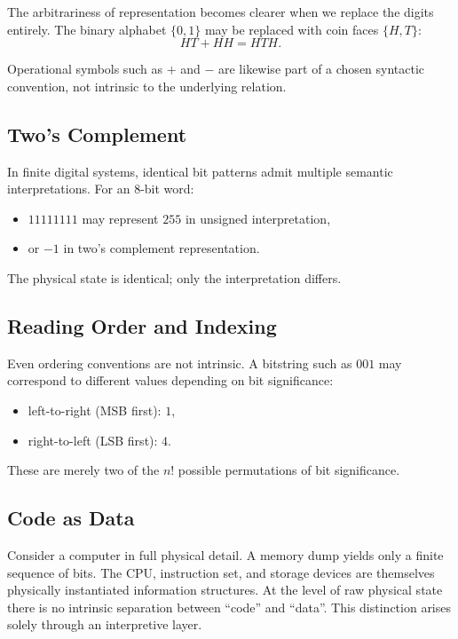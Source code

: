 The arbitrariness of representation becomes clearer when we replace the digits entirely.
The binary alphabet $\{0,1\}$ may be replaced with coin faces $\{H,T\}$:
\[
HT + HH = HTH.
\]

Operational symbols such as $+$ and $-$ are likewise part of a chosen syntactic convention, not intrinsic to the underlying relation.

\subsection*{Two's Complement}

In finite digital systems, identical bit patterns admit multiple semantic interpretations.
For an 8-bit word:
\begin{itemize}
\item $11111111$ may represent $255$ in unsigned interpretation,
\item or $-1$ in two's complement representation.
\end{itemize}

The physical state is identical; only the interpretation differs.

\subsection*{Reading Order and Indexing}

Even ordering conventions are not intrinsic.
A bitstring such as $001$ may correspond to different values depending on bit significance:
\begin{itemize}
\item left-to-right (MSB first): $1$,
\item right-to-left (LSB first): $4$.
\end{itemize}

These are merely two of the $n!$ possible permutations of bit significance.

\subsection*{Code as Data}

Consider a computer in full physical detail.
A memory dump yields only a finite sequence of bits.
The CPU, instruction set, and storage devices are themselves physically instantiated information structures.
At the level of raw physical state there is no intrinsic separation between ``code'' and ``data''.
This distinction arises solely through an interpretive layer.

